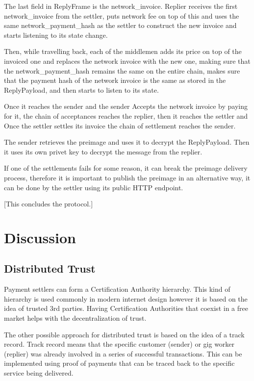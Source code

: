 \documentclass{article}
\begin{document}
The last field in ReplyFrame is the network\_invoice. Replier receives the first network\_invoice from the settler, puts network fee on top of this and uses the same network\_payment\_hash as the settler to construct the new invoice and starts listening to its state change. 

Then, while travelling back, each of the middlemen adds its price on top of the invoiced one and replaces the network invoice with the new one, making sure that the network\_payment\_hash remains the same on the entire chain, makes sure that the payment hash of the network invoice is the same as stored in the ReplyPayload, and then starts to listen to its state.

Once it reaches the sender and the sender Accepts the network invoice by paying for it, the chain of acceptances reaches the replier, then it reaches the settler and Once the settler settles its invoice the chain of settlement reaches the sender.

The sender retrieves the preimage and uses it to decrypt the ReplyPayload. Then it uses its own privet key to decrypt the message from the replier.

If one of the settlements fails for some reason, it can break the preimage delivery process, therefore it is important to publish the preimage in an alternative way, it can be done by the settler using its public HTTP endpoint.

[This concludes the protocol.]

\section{Discussion}

\subsection{Distributed Trust}

Payment settlers can form a Certification Authority hierarchy. This kind of hierarchy is used commonly in modern internet design however it is based on the idea of trusted 3rd parties. Having Certification Authorities that coexist in a free market helps with the decentralization of trust.

The other possible approach for distributed trust is based on the idea of a track record. Track record means that the specific customer (sender) or gig worker (replier) was already involved in a series of successful transactions. This can be implemented using proof of payments that can be traced back to the specific service being delivered.
\end{document}
